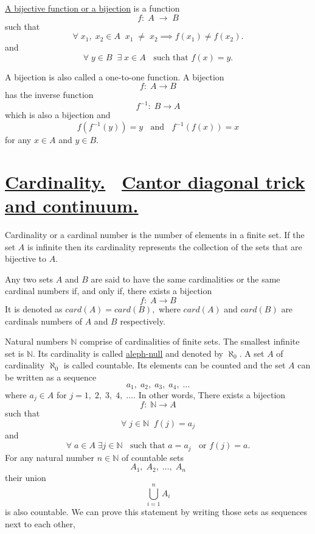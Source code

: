 \documentclass[color=black,11pt]{elegantpaper}
\begin{document}
\begin{definition}
\href{https://en.wikipedia.org/wiki/Bijection#:~:text=In%20mathematics%2C%20a%20bijection%2C%20also,with%20exactly%20one%20element%20of}{A bijective function or a bijection} is a function
$$
f:\;A\;\to \; B
$$
such that
$$
\forall\;x_1,\; x_2 \in A\;\;x_1 \; \not=\; x_2 \implies f(x_1) \not= f(x_2).
$$
and
$$
\forall \;y \in B\;\;\exists\;x \in A\;\;\mbox{ such that } f(x)=y.
$$
\end{definition}
A bijection is also called a one-to-one function. A bijection 
$$
f:\;A\to B
$$
has the inverse function
$$
f^{-1} :\; B \to A
$$
which is also a bijection and
$$
f(f^{-1}(y)) = y \;\;\mbox{ and }\;\;f^{-1}(f(x))=x
$$
for any $x\in A$ and $y \in B.$


\section{\href{https://en.wikipedia.org/wiki/Cardinality}{Cardinality.} ~\href{https://en.wikipedia.org/wiki/Cantor's_diagonal_argumenT}{Cantor diagonal trick and continuum.} }
\label{sec:Cardinality}
Cardinality or a cardinal number is the number of elements in a finite set. If the set $A$ is infinite then its cardinality represents the collection of the sets that are bijective to $A.$
\begin{definition}
Any two sets $A$ and $B$ are said to have the same cardinalities or the same cardinal numbers if, and only if, there exists a bijection
$$
f :\; A \to B
$$
It is denoted as $card(A) = card(B),$ where $card(A)$ and $card(B)$ are cardinals numbers of $A$ and $B$ respectively.
\end{definition}
Natural numbers $\mathbb{N}$ comprise of cardinalities of finite sets. The smallest infinite set is $\mathbb{N}.$ Its cardinality is called \href{https://en.wikipedia.org/wiki/Aleph_number}{aleph-null} and denoted by $\aleph_0.$ A set $A$ of cardinality $\aleph_0$ is called countable. Its elements can be counted and the set $A$ can be written as a sequence
$$
a_1,\;a_2,\;a_3,\;a_4,\; \dots
$$
where $a_j \in A$ for $j=1,\;2,\;3,\;4,\;\dots.$ In other words, There exists a bijection
$$
f:\;\mathbb{N} \to A
$$
such that
$$
\forall\; j\in \mathbb{N}\;\;f(j)= a_j
$$
and
$$
\forall \; a \in A \; \exists j\in \mathbb{N} \;\;\mbox{ such that } a = a_j\;\;\mbox{ or } f(j) = a.
$$
For any natural number $n \in \mathbb{N}$ of countable sets
$$
A_1,\;A_2,\;\dots ,\; A_n
$$
their union
$$
\bigcup_{i = 1}^n A_i 
$$
is also countable. We can prove this statement by writing those sets as sequences next to each other,
\end{document}
